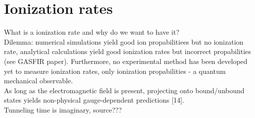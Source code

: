 \section{Ionization rates}
What is a ionization rate and why do we want to have it?\\
Dilemma: numerical simulations yield good ion propabilitiees but no ionization rate, analytical calculations yield good ionization rates but incorrect propabilities (see GASFIR paper).
Furthermore, no experimental method has been developed yet to measure ionization rates, only ionization propabilities - a quantum mechanical observable.\\
As long as the electromagnetic
field is present, projecting onto bound/unbound states
yields non-physical gauge-dependent predictions [14].\\       %
Tunneling time is imaginary, source???\\












